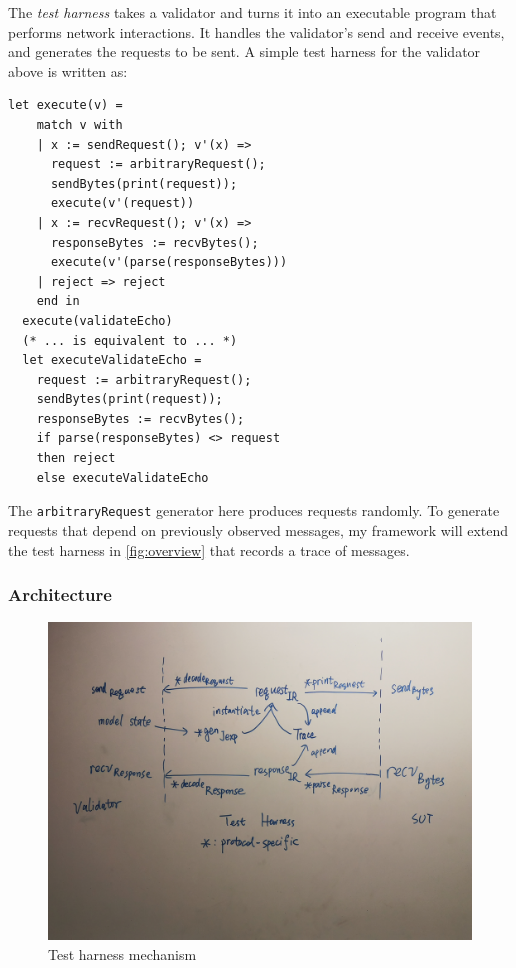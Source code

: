 \documentclass{article}
\newcommand{\ilc}[1]{\lstinline[style=customcoq]{#1}}
\begin{document}
The {\em test harness} takes a validator and turns it into an executable program
that performs network interactions.  It handles the validator's send and receive
events, and generates the requests to be sent.  A simple test harness for the
validator above is written as:
\begin{lstlisting}[style=customcoq]
  let execute(v) =
    match v with
    | x := sendRequest(); v'(x) =>
      request := arbitraryRequest();
      sendBytes(print(request));
      execute(v'(request))
    | x := recvRequest(); v'(x) =>
      responseBytes := recvBytes();
      execute(v'(parse(responseBytes)))
    | reject => reject
    end in
  execute(validateEcho)
  (* ... is equivalent to ... *)
  let executeValidateEcho =
    request := arbitraryRequest();
    sendBytes(print(request));
    responseBytes := recvBytes();
    if parse(responseBytes) <> request
    then reject
    else executeValidateEcho
\end{lstlisting}

The \ilc{arbitraryRequest} generator here produces requests randomly.  To
generate requests that depend on previously observed messages, my framework will
extend the test harness in \autoref{fig:overview} that records a trace of
messages.

\subsubsection{Architecture}
\begin{figure}
  \centering
  \includegraphics[width=.9\textwidth]{figures/harness}
  \caption{Test harness mechanism}
  \label{fig:harness}
\end{figure}
\end{document}
